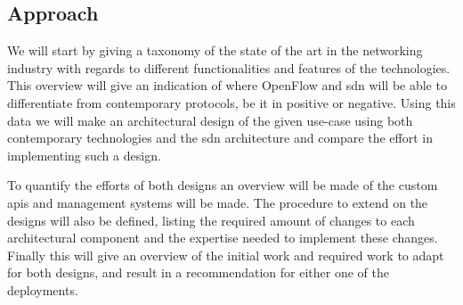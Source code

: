 	\subsection*{Approach} %
	\label{sub:approach}
	We will start by giving a taxonomy of the state of the art in the networking industry with regards to different functionalities and features of the technologies. This overview will give an indication of where OpenFlow and \ac{sdn} will be able to differentiate from contemporary protocols, be it in positive or negative. Using this data we will make an architectural design of the given use-case using both contemporary technologies and the \ac{sdn} architecture and compare the effort in implementing such a design.

	To quantify the efforts of both designs an overview will be made of the custom \acp{api}  and management systems will be made. The procedure to extend on the designs will also be defined, listing the required amount of changes to each architectural component and the expertise needed to implement these changes. Finally this will give an overview of the initial work and required work to adapt for both designs, and result in a recommendation for either one of the deployments.


